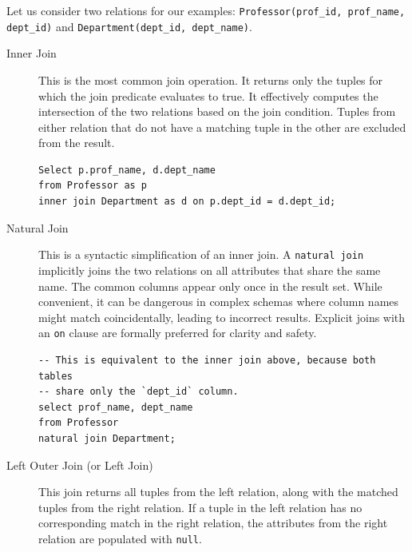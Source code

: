 Let us consider two relations for our examples: \texttt{Professor(prof\_id, prof\_name, dept\_id)} and \texttt{Department(dept\_id, dept\_name)}.

\begin{description}
    \item[Inner Join] This is the most common join operation. It returns only the tuples for which the join predicate evaluates to true. It effectively computes the intersection of the two relations based on the join condition. Tuples from either relation that do not have a matching tuple in the other are excluded from the result.

    \begin{center}
    \end{center}

    \begin{verbatim}
Select p.prof_name, d.dept_name
from Professor as p
inner join Department as d on p.dept_id = d.dept_id;
    \end{verbatim}

    \item[Natural Join] This is a syntactic simplification of an inner join. A \texttt{natural join} implicitly joins the two relations on all attributes that share the same name. The common columns appear only once in the result set. While convenient, it can be dangerous in complex schemas where column names might match coincidentally, leading to incorrect results. Explicit joins with an \texttt{on} clause are formally preferred for clarity and safety.

    \begin{verbatim}
-- This is equivalent to the inner join above, because both tables
-- share only the `dept_id` column.
select prof_name, dept_name
from Professor
natural join Department;
    \end{verbatim}

    \item[Left Outer Join (or Left Join)] This join returns all tuples from the left relation, along with the matched tuples from the right relation. If a tuple in the left relation has no corresponding match in the right relation, the attributes from the right relation are populated with \texttt{null}.


\end{description}
